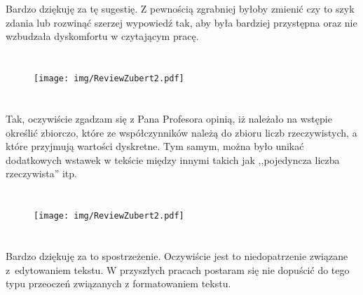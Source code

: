 \section*{}
\begin{frame}
\frametitle{\secname}
Bardzo dziękuję za tę sugestię. Z pewnością zgrabniej byłoby zmienić czy to szyk zdania lub rozwinąć szerzej wypowiedź tak, aby była bardziej przystępna oraz nie wzbudzała dyskomfortu w czytającym pracę.
\end{frame}

\section*{}
\begin{frame}
\frametitle{\secname}
\begin{figure}[!ht]
\centering
\texttt{[image: img/ReviewZubert2.pdf]}	
\end{figure}
\end{frame}

\section*{}
\begin{frame}
\frametitle{\secname}
Tak, oczywiście zgadzam się z Pana Profesora opinią, iż należało na wstępie określić zbiorczo, które ze współczynników należą do zbioru liczb rzeczywistych, a które przyjmują wartości dyskretne. Tym samym, można było unikać dodatkowych wstawek w tekście między innymi takich jak ,,pojedyncza liczba rzeczywista'' itp.
\end{frame}

\section*{}
\begin{frame}
\frametitle{\secname}
\begin{figure}[!ht]
\centering
\texttt{[image: img/ReviewZubert2.pdf]}	
\end{figure}
\end{frame}

\section*{}
\begin{frame}
\frametitle{\secname}
Bardzo dziękuję za to spostrzeżenie. Oczywiście jest to niedopatrzenie związane z~edytowaniem tekstu. W przyszłych pracach postaram się nie dopuścić do tego typu przeoczeń związanych z formatowaniem tekstu.
\end{frame}

